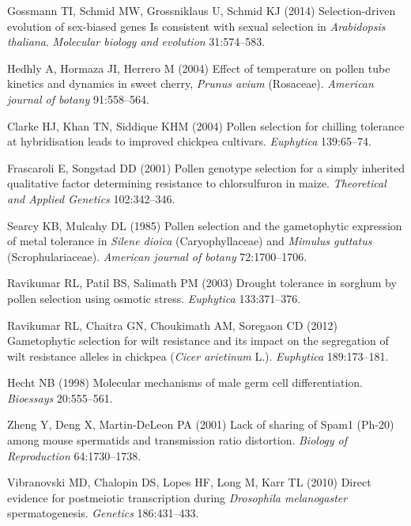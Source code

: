 \begin{thebibliography}{20}
Gossmann TI, Schmid MW, Grossniklaus U, Schmid KJ
 (2014) {Selection-driven evolution of sex-biased genes Is consistent
  with sexual selection in \textit{Arabidopsis thaliana}}.
 \textit{Molecular biology and evolution} 31:574--583.

Hedhly A, Hormaza JI, Herrero M
 (2004) {Effect of temperature on pollen tube kinetics and dynamics in
  sweet cherry, \textit{Prunus avium} (Rosaceae).}
 \textit{American journal of botany} 91:558--564.

Clarke HJ, Khan TN, Siddique KHM
 (2004) {Pollen selection for chilling tolerance at hybridisation
  leads to improved chickpea cultivars}.
 \textit{Euphytica} 139:65--74.

Frascaroli E, Songstad DD
 (2001) {Pollen genotype selection for a simply inherited qualitative
  factor determining resistance to chlorsulfuron in maize}.
 \textit{Theoretical and Applied Genetics} 102:342--346.

Searcy KB, Mulcahy DL
 (1985) {Pollen selection and the gametophytic expression of metal
  tolerance in \textit{Silene dioica} (Caryophyllaceae) and \textit{Mimulus
  guttatus} (Scrophulariaceae)}.
 \textit{American journal of botany} 72:1700--1706.

Ravikumar RL, Patil BS, Salimath PM
 (2003) {Drought tolerance in sorghum by pollen selection using
  osmotic stress}.
 \textit{Euphytica} 133:371--376.

Ravikumar RL, Chaitra GN, Choukimath AM, Soregaon CD
 (2012) {Gametophytic selection for wilt resistance and its impact on
  the segregation of wilt resistance alleles in chickpea (\textit{Cicer
  arietinum} L.)}.
 \textit{Euphytica} 189:173--181.

Hecht NB
 (1998) {Molecular mechanisms of male germ cell differentiation}.
 \textit{Bioessays} 20:555--561.

Zheng Y, Deng X, Martin-DeLeon PA
 (2001) {Lack of sharing of Spam1 (Ph-20) among mouse spermatids and
  transmission ratio distortion}.
 \textit{Biology of Reproduction} 64:1730--1738.

Vibranovski MD, Chalopin DS, Lopes HF, Long M, Karr TL
 (2010) {Direct evidence for postmeiotic transcription during
  \textit{Drosophila melanogaster} spermatogenesis}.
 \textit{Genetics} 186:431--433.


\end{thebibliography}
